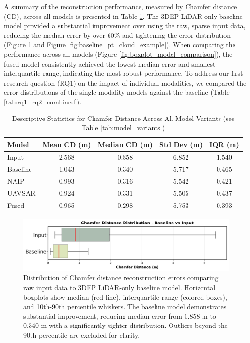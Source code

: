 \documentclass[remotesensing,article,submit,pdftex,moreauthors]{Definitions/mdpi}
\begin{document}
A summary of the reconstruction performance, measured by Chamfer distance (CD), across all models is presented in Table \ref{tab:descriptive_stats}. The 3DEP LiDAR-only baseline model provided a substantial improvement over using the raw, sparse input data, reducing the median error by over 60\% and tightening the error distribution (Figure \ref{fig:baseline_v_input_boxplot} and Figure \ref{fig:baseline_pt_cloud_example}). When comparing the performance across all models (Figure \ref{fig:boxplot_model_comparison}), the fused model consistently achieved the lowest median error and smallest interquartile range, indicating the most robust performance. To address our first research question (RQ1) on the impact of individual modalities, we compared the error distributions of the single-modality models against the baseline (Table \ref{tab:rq1_rq2_combined}).


\begin{table}[htbp]
\centering
\caption{Descriptive Statistics for Chamfer Distance Across All Model Variants (see Table \ref{tab:model_variants})}
\begin{tabular}{lcccc}
\toprule
\textbf{Model} & \textbf{Mean CD (m)} & \textbf{Median CD (m)} & \textbf{Std Dev (m)} & \textbf{IQR (m)} \\
\midrule
Input & 2.568 & 0.858 & 6.852 & 1.540 \\
Baseline & 1.043 & 0.340 & 5.717 & 0.465 \\
NAIP & 0.993 & 0.316 & 5.542 & 0.421 \\
UAVSAR & 0.924 & 0.331 & 5.505 & 0.437 \\
Fused & 0.965 & 0.298 & 5.753 & 0.393 \\
\bottomrule
\end{tabular}
\label{tab:descriptive_stats}
\end{table}



\begin{figure}[!b]
    \centering
    \includegraphics[width=0.9\linewidth]{manuscript/figures/baseline_v_input_boxplot.png}
    \caption{Distribution of Chamfer distance reconstruction errors comparing raw input data to 3DEP LiDAR-only baseline model. Horizontal boxplots show median (red line), interquartile range (colored boxes), and 10th-90th percentile whiskers. The baseline model demonstrates substantial improvement, reducing median error from 0.858 m to 0.340 m with a significantly tighter distribution. Outliers beyond the 90th percentile are excluded for clarity.}
    \label{fig:baseline_v_input_boxplot}
\end{figure}
\end{document}
